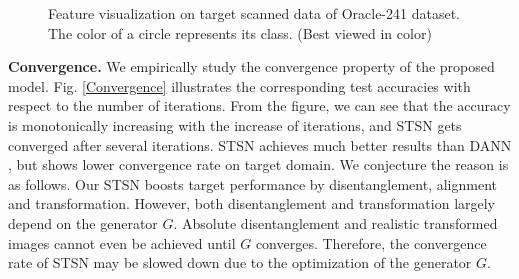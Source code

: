\documentclass[10pt,journal,compsoc,twocolumn ]{IEEEtran}
\begin{document}
\begin{figure}
\centering
{}
\hspace{0cm}
\caption{Feature visualization on target scanned data of Oracle-241 dataset. The color of a circle represents its class. %
(Best viewed in color)}
\label{intra_visual} %
\end{figure}

\textbf{Convergence.} We empirically study the convergence property of the proposed model. Fig. \ref{Convergence} illustrates the corresponding test accuracies with respect to the number of iterations. From the figure, we can see that the accuracy is monotonically increasing with the increase of iterations, and STSN gets converged after several iterations. STSN achieves much better results than DANN \cite{Ganin2015Unsupervised}, but shows lower convergence rate on target domain. We conjecture the reason is as follows. Our STSN boosts target performance by disentanglement, alignment and transformation. However, both disentanglement and transformation largely depend on the generator $G$. %
Absolute disentanglement and realistic transformed images cannot even be achieved until $G$ converges. Therefore, the convergence rate of STSN may be slowed down due to the optimization of the generator $G$.
\end{document}
